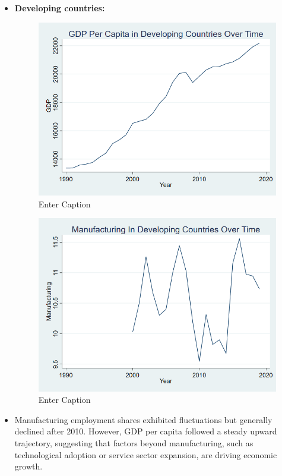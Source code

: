 \documentclass[12pt]{article}
\begin{document}
\begin{itemize}
\item \textbf{Developing countries:} 
\begin{figure}
    \centering
    \includegraphics[width=0.5\linewidth]{GDP DEVELOPING GRAPH.png}
    \caption{Enter Caption}
    \label{fig:enter-label}
\end{figure}
\begin{figure}
    \centering
    \includegraphics[width=0.5\linewidth]{FINAL GRAPH MFT DEVELOPING.png}
    \caption{Enter Caption}
    \label{fig:enter-label}
\end{figure}
\item Manufacturing employment shares exhibited fluctuations but generally declined after 2010. However, GDP per capita followed a steady upward trajectory, suggesting that factors beyond manufacturing, such as technological adoption or service sector expansion, are driving economic growth.


\end{itemize}
\end{document}
